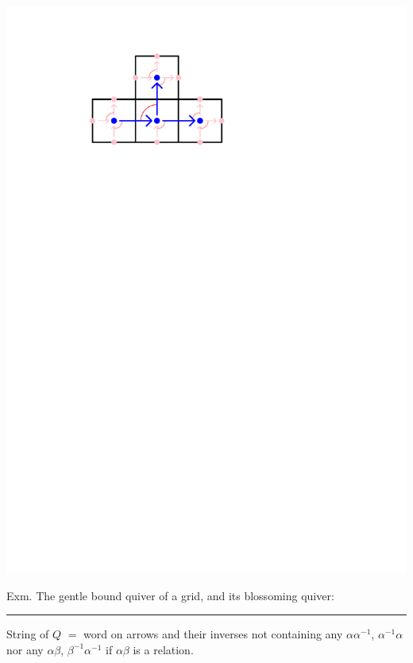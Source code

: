 \documentclass[portrait,final,a0paper,fontscale=0.25]{baposter}
\theoremstyle{definition}
\begin{document}
\begin{poster}
{\vspace*{-.6cm}\hspace*{6cm}\includegraphics[scale=.4]{BlossomingQuiverGrid}

\vspace*{-1cm}
\begin{minipage}{5.5cm}
Exm. The gentle bound quiver of a grid, and its blossoming quiver: 
\end{minipage}

\vspace{.15cm}
\hspace{-.25cm}
{\color{green} \rule{10.02cm}{1pt}}
\vspace{-.4cm}

{\color{green} String} of $Q$ $=$ word on arrows and their inverses not containing any $\alpha\alpha^{-1}$, $\alpha^{-1}\alpha$ nor any $\alpha\beta$, $\beta^{-1}\alpha^{-1}$ if $\alpha\beta$ is a relation.

}
\end{poster}
\end{document}
